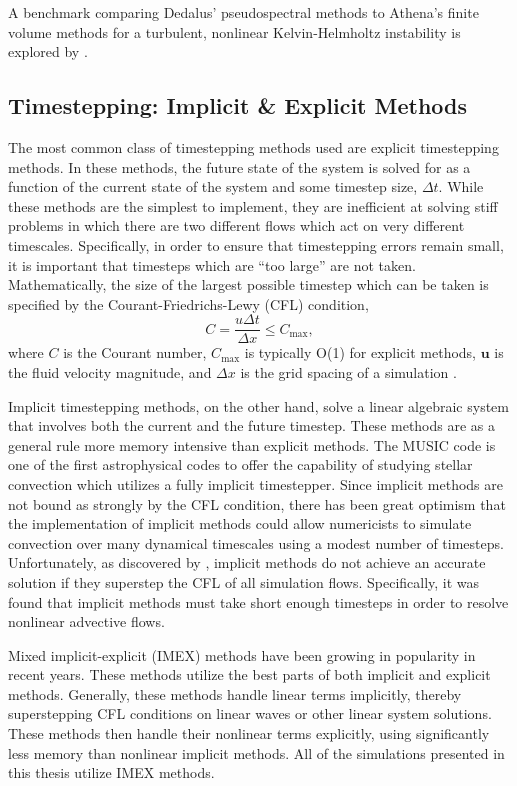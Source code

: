 A benchmark comparing Dedalus' pseudospectral methods to Athena's finite volume methods for a turbulent, nonlinear Kelvin-Helmholtz instability is explored by \citet{Lecoanet_et_al_2016_KH}.


\subsection{Timestepping: Implicit \& Explicit Methods}
\label{sct:intro_timestepping}
The most common class of timestepping methods used are explicit timestepping methods.
In these methods, the future state of the system is solved for as a function of the current state of the system and some timestep size, $\Delta t$.
While these methods are the simplest to implement, they are inefficient at solving stiff problems in which there are two different flows which act on very different timescales.
Specifically, in order to ensure that timestepping errors remain small, it is important that timesteps which are ``too large'' are not taken.
Mathematically, the size of the largest possible timestep which can be taken is specified by the Courant-Friedrichs-Lewy (CFL) condition,
\begin{equation}
C = \frac{u \Delta t}{\Delta x} \leq C_{\text{max}},
\end{equation}
where $C$ is the Courant number, $C_{\text{max}}$ is typically O(1) for explicit methods, $\bm{u}$ is the fluid velocity magnitude, and $\Delta x$ is the grid spacing of a simulation \citep{cfl1967}.

Implicit timestepping methods, on the other hand, solve a linear algebraic system that involves both the current and the future timestep.
These methods are as a general rule more memory intensive than explicit methods.
The MUSIC code is one of the first astrophysical codes to offer the capability of studying stellar convection which utilizes a fully implicit timestepper.
Since implicit methods are not bound as strongly by the CFL condition, there has been great optimism that the implementation of implicit methods could allow numericists to simulate convection over many dynamical timescales using a modest number of timesteps.
Unfortunately, as discovered by \citet{viallet&all2011, viallet&all2013, viallet&all2016}, implicit methods do not achieve an accurate solution if they superstep the CFL of all simulation flows.
Specifically, it was found that implicit methods must take short enough timesteps in order to resolve nonlinear advective flows.

Mixed implicit-explicit (IMEX) methods have been growing in popularity in recent years.
These methods utilize the best parts of both implicit and explicit methods.
Generally, these methods handle linear terms implicitly, thereby superstepping CFL conditions on linear waves or other linear system solutions.
These methods then handle their nonlinear terms explicitly, using significantly less memory than nonlinear implicit methods.
All of the simulations presented in this thesis utilize IMEX methods.



